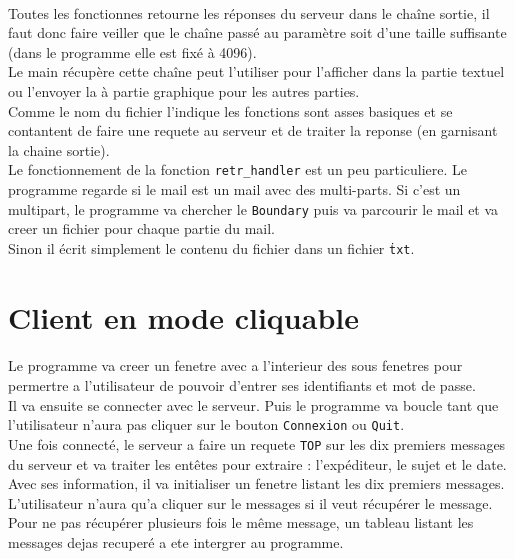 \documentclass[a4paper, titlepage, oneside, 12pt]{article}%
\begin{document}
\paragraph{}
Toutes les fonctionnes retourne les réponses du serveur dans le chaîne sortie, il faut donc faire veiller que le chaîne passé au paramètre soit d'une taille suffisante (dans le programme elle est fixé à 4096).\\
Le main récupère cette chaîne peut l'utiliser pour l'afficher dans la partie textuel ou l'envoyer la à partie graphique pour les autres parties.\\
Comme le nom du fichier l'indique les fonctions sont asses basiques et se contantent de faire une requete au serveur et de traiter la reponse (en garnisant la chaine sortie).\\
Le fonctionnement de la fonction \texttt{retr\_handler} est un peu particuliere. Le programme regarde si le mail est un mail avec des multi-parts. Si c'est un multipart, le programme va chercher le \texttt{Boundary} puis va parcourir le mail et va creer un fichier pour chaque partie du mail.\\
Sinon il écrit simplement le contenu du fichier dans un fichier \texttt{\.txt}.

\section{Client en mode cliquable}
\paragraph{}
Le programme va creer un fenetre avec a l'interieur des sous fenetres pour permertre a l'utilisateur de pouvoir d'entrer ses identifiants et mot de passe.\\
Il va ensuite se connecter avec le serveur. Puis le programme va boucle tant que l'utilisateur n'aura pas cliquer sur le bouton \texttt{Connexion} ou \texttt{Quit}.\\
Une fois connecté, le serveur a faire un requete \texttt{TOP} sur les dix premiers messages du serveur et va traiter les entêtes pour extraire : l’expéditeur, le sujet et le date. Avec ses information, il va initialiser un fenetre listant les dix premiers messages. L'utilisateur n'aura qu'a cliquer sur le messages si il veut récupérer le message.\\
Pour ne pas récupérer plusieurs fois le même message, un tableau listant les messages dejas recuperé a ete intergrer au programme.
\end{document}

